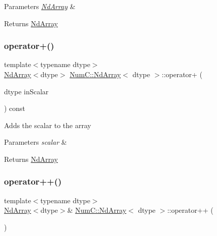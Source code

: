 \begin{DoxyParams}{Parameters}
{\em \mbox{\hyperlink{class_num_c_1_1_nd_array}{Nd\+Array}}} & \\
\hline
\end{DoxyParams}
\begin{DoxyReturn}{Returns}
\mbox{\hyperlink{class_num_c_1_1_nd_array}{Nd\+Array}} 
\end{DoxyReturn}
\mbox{\label{class_num_c_1_1_nd_array_afebba69128d3f3b5f72de7e4c952f4d5}} 
\subsubsection{\texorpdfstring{operator+()}{operator+()}\hspace{0.1cm}{\footnotesize\ttfamily [2/2]}}
{\footnotesize\ttfamily template$<$typename dtype$>$ \\
\mbox{\hyperlink{class_num_c_1_1_nd_array}{Nd\+Array}}$<$dtype$>$ \mbox{\hyperlink{class_num_c_1_1_nd_array}{Num\+C\+::\+Nd\+Array}}$<$ dtype $>$\+::operator+ (\begin{DoxyParamCaption}\item[{dtype}]{in\+Scalar }\end{DoxyParamCaption}) const\hspace{0.3cm}{\ttfamily [inline]}}

Adds the scalar to the array


\begin{DoxyParams}{Parameters}
{\em scalar} & \\
\hline
\end{DoxyParams}
\begin{DoxyReturn}{Returns}
\mbox{\hyperlink{class_num_c_1_1_nd_array}{Nd\+Array}} 
\end{DoxyReturn}
\mbox{\label{class_num_c_1_1_nd_array_ac3973c61bcd5933d28b186c97a455e8d}} 
\subsubsection{\texorpdfstring{operator++()}{operator++()}\hspace{0.1cm}{\footnotesize\ttfamily [1/2]}}
{\footnotesize\ttfamily template$<$typename dtype$>$ \\
\mbox{\hyperlink{class_num_c_1_1_nd_array}{Nd\+Array}}$<$dtype$>$\& \mbox{\hyperlink{class_num_c_1_1_nd_array}{Num\+C\+::\+Nd\+Array}}$<$ dtype $>$\+::operator++ (\begin{DoxyParamCaption}{ }\end{DoxyParamCaption})\hspace{0.3cm}{\ttfamily [inline]}}

